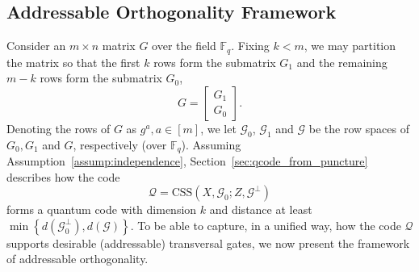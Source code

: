 \documentclass[11pt]{article}
\theoremstyle{definition}
\newcommand{\CSS}{\text{CSS}}
\newcommand{\bbF}{\mathbb{F}}
\newcommand{\qcode}{\mathcal{Q}}
\begin{document}
\subsection{Addressable Orthogonality Framework}\label{sec:addressable_orthogonality}

Consider an $m\times n$ matrix $G$ over the field $\bbF_q$. 
Fixing $k < m$, we may partition the matrix so that the first $k$ rows form the submatrix $G_1$  and the remaining $m-k$ rows form the submatrix $G_0$,
\begin{equation}
    G = 
    \begin{bmatrix}
        G_1\\
        G_0
    \end{bmatrix}.
    \label{eq:def_G}
\end{equation}
Denoting the rows of $G$ as $g^a, a\in [m]$, we let $\mathcal{G}_0$, $\mathcal{G}_1$ and $\mathcal{G}$ be the row spaces of $G_0, G_1$ and $G$, respectively (over $\mathbb{F}_q$). Assuming Assumption~\ref{assump:independence}, Section~\ref{sec:qcode_from_puncture} describes how the code
\begin{equation}\label{eq:repeated_qcode_defn}
    \mathcal{Q} = \CSS(X,\mathcal{G}_0;Z,\mathcal{G}^\perp)
\end{equation}
forms a quantum code with dimension $k$ and distance at least $\min\left\{d(\mathcal{G}_0^\perp), d(\mathcal{G})\right\}$. To be able to capture, in a unified way, how the code $\qcode$ supports desirable (addressable) transversal gates, we now present the framework of addressable orthogonality.
\end{document}
